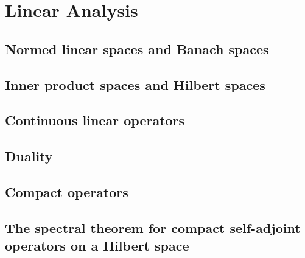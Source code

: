 \chapter{Linear Analysis}\label{cha:linear-analysis}

\section{Normed linear spaces and Banach spaces}

\section{Inner product spaces and Hilbert spaces}

\section{Continuous linear operators}

\section{Duality}

\section{Compact operators}

\section{The spectral theorem for compact self-adjoint operators on a Hilbert space}

